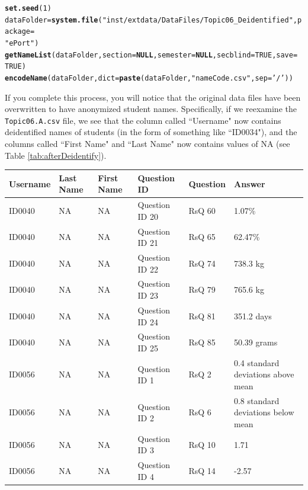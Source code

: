 \documentclass{article}\usepackage[]{graphicx}\usepackage[]{color}
\makeatletter
\newcommand{\hlnum}[1]{\textcolor[rgb]{0.686,0.059,0.569}{#1}}%
\newcommand{\hlstr}[1]{\textcolor[rgb]{0.192,0.494,0.8}{#1}}%
\newcommand{\hlstd}[1]{\textcolor[rgb]{0.345,0.345,0.345}{#1}}%
\newcommand{\hlkwa}[1]{\textcolor[rgb]{0.161,0.373,0.58}{\textbf{#1}}}%
\newcommand{\hlkwb}[1]{\textcolor[rgb]{0.69,0.353,0.396}{#1}}%
\newcommand{\hlkwc}[1]{\textcolor[rgb]{0.333,0.667,0.333}{#1}}%
\newcommand{\hlkwd}[1]{\textcolor[rgb]{0.737,0.353,0.396}{\textbf{#1}}}%
\newenvironment{kframe}{%
 \def\at@end@of@kframe{}%
 \ifinner\ifhmode%
  \def\at@end@of@kframe{\end{minipage}}%
  \begin{minipage}{\columnwidth}%
 \fi\fi%
 \def\FrameCommand##1{\hskip\@totalleftmargin \hskip-\fboxsep
 \colorbox{shadecolor}{##1}\hskip-\fboxsep
     \hskip-\linewidth \hskip-\@totalleftmargin \hskip\columnwidth}%
 \MakeFramed {\advance\hsize-\width
   \@totalleftmargin\z@ \linewidth\hsize
   \@setminipage}}%
 {\par\unskip\endMakeFramed%
 \at@end@of@kframe}
\newenvironment{knitrout}{}{} %
\numberwithin{equation}{section} %
\makeatother
\begin{document}
\begin{knitrout}
\color{fgcolor}\begin{kframe}
\begin{alltt}
\hlkwd{set.seed}\hlstd{(}\hlnum{1}\hlstd{)}
\hlstd{dataFolder} \hlkwb{=} \hlkwd{system.file}\hlstd{(}\hlstr{"inst/extdata/DataFiles/Topic06_Deidentified"}\hlstd{,} \hlkwc{package} \hlstd{=}
  \hlstr{"ePort"}\hlstd{)}
\hlkwd{getNameList}\hlstd{(dataFolder,} \hlkwc{section} \hlstd{=} \hlkwa{NULL}\hlstd{,} \hlkwc{semester} \hlstd{=} \hlkwa{NULL}\hlstd{,} \hlkwc{secblind} \hlstd{=} \hlnum{TRUE}\hlstd{,} \hlkwc{save} \hlstd{=}
  \hlnum{TRUE}\hlstd{)}
\hlkwd{encodeName}\hlstd{(dataFolder,} \hlkwc{dict} \hlstd{=} \hlkwd{paste}\hlstd{(dataFolder,} \hlstr{"nameCode.csv"}\hlstd{,} \hlkwc{sep} \hlstd{=} \hlstr{'/'}\hlstd{))}
\end{alltt}
\end{kframe}
\end{knitrout}

If you complete this process, you will notice that the original data files have been overwritten to have anonymized student names. Specifically, if we reexamine the \texttt{Topic06.A.csv} file, we see that the column called ``Username" now contains deidentified names of students (in the form of something like ``ID0034"), and the columns called ``First Name" and ``Last Name" now contains values of NA (see Table \ref{tab:afterDeidentify}).

\begin{center}
\label{tab:afterDeidentify}
\begin{tabular} { | l | l | l | l | l | l |}
\hline \textbf{Username} & \textbf{Last Name} & \textbf{First Name} & \textbf{Question ID} & \textbf{Question} & \textbf{Answer} \\
\hline
ID0040 & NA & NA & Question ID 20 & RsQ 60 & 1.07\% \\
\hline
ID0040 & NA & NA & Question ID 21 & RsQ 65 & 62.47\% \\
\hline
ID0040 & NA & NA & Question ID 22 & RsQ 74 & 738.3 kg \\
\hline
ID0040 & NA & NA & Question ID 23 & RsQ 79 & 765.6 kg\\
\hline
ID0040 & NA & NA & Question ID 24 & RsQ 81 & 351.2 days \\
\hline
ID0040 & NA & NA & Question ID 25 & RsQ 85 & 50.39 grams \\
\hline
ID0056 & NA & NA & Question ID 1 & RsQ 2 & 0.4 standard deviations above mean \\
\hline
ID0056 & NA & NA & Question ID 2 & RsQ 6 & 0.8 standard deviations below mean \\
\hline
ID0056 & NA & NA & Question ID 3 & RsQ 10 & 1.71 \\
\hline
ID0056 & NA & NA & Question ID 4 & RsQ 14 & -2.57 \\
\hline
\end{tabular}
\end{center}
\end{document}
